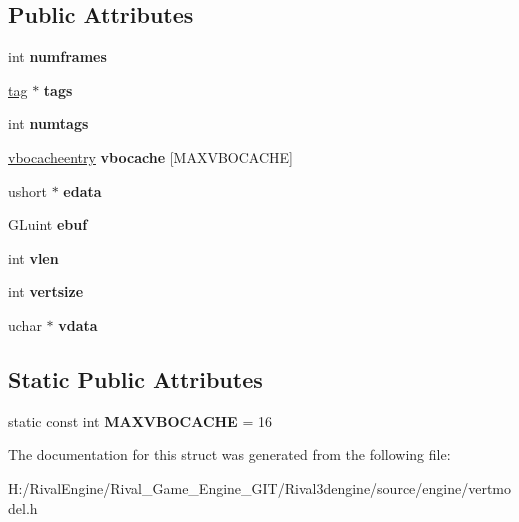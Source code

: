\subsection*{Public Attributes}
\begin{DoxyCompactItemize}
\item 
\mbox{\label{structvertmodel_1_1vertmeshgroup_a53fa567f581ce3ed8df31b656ec2b43b}} 
int {\bfseries numframes}
\item 
\mbox{\label{structvertmodel_1_1vertmeshgroup_a3d8bdd0f8c5e4f9be178bc06d5b53468}} 
\hyperlink{structvertmodel_1_1tag}{tag} $\ast$ {\bfseries tags}
\item 
\mbox{\label{structvertmodel_1_1vertmeshgroup_ae0e526366163ecc2c407580d436bd91a}} 
int {\bfseries numtags}
\item 
\mbox{\label{structvertmodel_1_1vertmeshgroup_a8cc63ab862835fedf864eae2663fec21}} 
\hyperlink{structvertmodel_1_1vbocacheentry}{vbocacheentry} {\bfseries vbocache} \mbox{[}M\+A\+X\+V\+B\+O\+C\+A\+C\+HE\mbox{]}
\item 
\mbox{\label{structvertmodel_1_1vertmeshgroup_a63d42d34a7988f08b65213992e923c43}} 
ushort $\ast$ {\bfseries edata}
\item 
\mbox{\label{structvertmodel_1_1vertmeshgroup_ac2a8f1bb971af1fa3dbcc4e43b703078}} 
G\+Luint {\bfseries ebuf}
\item 
\mbox{\label{structvertmodel_1_1vertmeshgroup_a5f5a8b24b2c4126116ac2c6fa6470c66}} 
int {\bfseries vlen}
\item 
\mbox{\label{structvertmodel_1_1vertmeshgroup_ad16d144bf8b0141a9ce58fa8e8e3cc95}} 
int {\bfseries vertsize}
\item 
\mbox{\label{structvertmodel_1_1vertmeshgroup_adb907a9e346795dd397ef8e6b00488b2}} 
uchar $\ast$ {\bfseries vdata}
\end{DoxyCompactItemize}
\subsection*{Static Public Attributes}
\begin{DoxyCompactItemize}
\item 
\mbox{\label{structvertmodel_1_1vertmeshgroup_a8ddbf3f040f3343199a7b0c68f930d84}} 
static const int {\bfseries M\+A\+X\+V\+B\+O\+C\+A\+C\+HE} = 16
\end{DoxyCompactItemize}


The documentation for this struct was generated from the following file\+:\begin{DoxyCompactItemize}
\item 
H\+:/\+Rival\+Engine/\+Rival\+\_\+\+Game\+\_\+\+Engine\+\_\+\+G\+I\+T/\+Rival3dengine/source/engine/vertmodel.\+h\end{DoxyCompactItemize}
